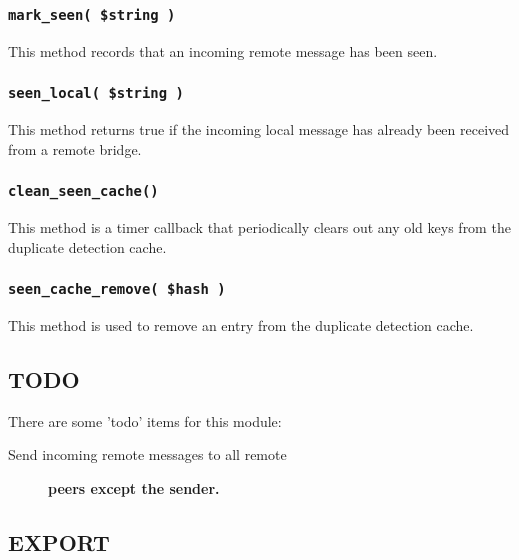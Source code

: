 \documentclass[12pt,a4paper]{article}
\begin{document}
\subsubsection*{\texttt{mark\_seen( \$string )}\label{xPL::Bridge_mark_seen_string_}}


This method records that an incoming remote message has been seen.

\subsubsection*{\texttt{seen\_local( \$string )}\label{xPL::Bridge_seen_local_string_}}


This method returns true if the incoming local message has already been
received from a remote bridge.

\subsubsection*{\texttt{clean\_seen\_cache()}\label{xPL::Bridge_clean_seen_cache_}}


This method is a timer callback that periodically clears out any
old keys from the duplicate detection cache.

\subsubsection*{\texttt{seen\_cache\_remove( \$hash )}\label{xPL::Bridge_seen_cache_remove_hash_}}


This method is used to remove an entry from the duplicate detection
cache.

\subsection*{TODO\label{xPL::Bridge_TODO}}


There are some 'todo' items for this module:

\begin{description}

\item[{Send incoming remote messages to all remote}] \textbf{peers except the sender.}\end{description}
\subsection*{EXPORT\label{xPL::Bridge_EXPORT}}
\end{document}
